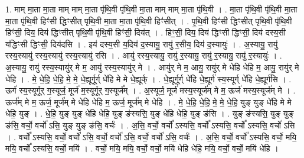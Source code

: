 \documentclass[17pt]{extarticle}
\begin{document}
1. माम् मा॒ता मा॒ता माम् माम् मा॒ता पृ॑थि॒वी पृ॑थि॒वी मा॒ता माम् माम् मा॒ता पृ॑थि॒वी । . मा॒ता पृ॑थि॒वी पृ॑थि॒वी मा॒ता मा॒ता पृ॑थि॒वी हिꣳ॑सी द्धिꣳसीत् पृथि॒वी मा॒ता मा॒ता पृ॑थि॒वी हिꣳ॑सीत् । . पृ॒थि॒वी हिꣳ॑सी द्धिꣳसीत् पृथि॒वी पृ॑थि॒वी हिꣳ॑सी॒ दिय॒ दिय॑ द्धिꣳसीत् पृथि॒वी पृ॑थि॒वी हिꣳ॑सी॒ दिय॑त् । . हिꣳ॒॒सी॒ दिय॒ दिय॑ द्धिꣳसी द्धिꣳसी॒ दिय॑ दस्य॒सी य॑द्धिꣳसी द्धिꣳसी॒ दिय॑दसि । . इय॑ दस्य॒सी य॒दिय॑ द॒स्यायु॒ रायु॑ र॒सीय॒ दिय॑ द॒स्यायुः॑ । . अ॒स्यायु॒ रायु॑ रस्य॒स्यायु॑ रस्य॒स्यायु॑ रस्य॒स्यायु॑ रसि । . आयु॑ रस्य॒स्यायु॒ रायु॑ र॒स्यायु॒ रायु॑ र॒स्यायु॒ रायु॑ र॒स्यायुः॑ । . अ॒स्यायु॒ रायु॑ रस्य॒स्यायु॑र् मे म॒ आयु॑ रस्य॒स्यायु॑र् मे । . आयु॑र् मे म॒ आयु॒ रायु॑र् मे धेहि धेहि म॒ आयु॒ रायु॑र् मे धेहि । . मे॒ धे॒हि॒ धे॒हि॒ मे॒ मे॒ धे॒ह्यूर्गूर्ग् धे॑हि मे मे धे॒ह्यूर्क् । . धे॒ह्यूर्गूर्ग् धे॑हि धे॒ह्यूर्ग॑ स्य॒स्यूर्ग् धे॑हि धे॒ह्यूर्ग॑सि । . ऊर्ग॑ स्य॒स्यूर्गूर् ग॒स्यूर्ज॒ मूर्ज॑ म॒स्यूर्गूर् ग॒स्यूर्ज᳚म् । . अ॒स्यूर्ज॒ मूर्ज॑ मस्य॒स्यूर्ज॑म् मे म॒ ऊर्ज॑ मस्य॒स्यूर्ज॑म् मे । . ऊर्ज॑म् मे म॒ ऊर्ज॒ मूर्ज॑म् मे धेहि धेहि म॒ ऊर्ज॒ मूर्ज॑म् मे धेहि । . मे॒ धे॒हि॒ धे॒हि॒ मे॒ मे॒ धे॒हि॒ युङ् युङ् धे॑हि मे मे धेहि॒ युङ् । . धे॒हि॒ युङ् युङ् धे॑हि धेहि॒ युङ् ङ॑स्यसि॒ युङ् धे॑हि धेहि॒ युङ् ङ॑सि । . युङ् ङ॑स्यसि॒ युङ् युङ् ङ॑सि॒ वर्चो॒ वर्चो॑ ऽसि॒ युङ् युङ् ङ॑सि॒ वर्चः॑ । . अ॒सि॒ वर्चो॒ वर्चो᳚ ऽस्यसि॒ वर्चो᳚ ऽस्यसि॒ वर्चो᳚ ऽस्यसि॒ वर्चो॑ ऽसि । . वर्चो᳚ ऽस्यसि॒ वर्चो॒ वर्चो॑ ऽसि॒ वर्चो॒ वर्चो॑ ऽसि॒ वर्चो॒ वर्चो॑ ऽसि॒ वर्चः॑ । . अ॒सि॒ वर्चो॒ वर्चो᳚ ऽस्यसि॒ वर्चो॒ मयि॒ मयि॒ वर्चो᳚ ऽस्यसि॒ वर्चो॒ मयि॑ । . वर्चो॒ मयि॒ मयि॒ वर्चो॒ वर्चो॒ मयि॑ धेहि धेहि॒ मयि॒ वर्चो॒ वर्चो॒ मयि॑ धेहि । \newline
\end{document}
